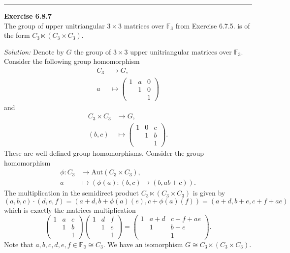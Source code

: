 \documentclass[a4paper, 12pt]{article}
\newenvironment{problem}[2][Exercise]
    { \begin{mdframed}[backgroundcolor=gray!20] \textbf{#1 #2} \\}
    {  \end{mdframed}}
\newenvironment{solution}
    {\textit{Solution:}}
    {}
\begin{document}
\noindent\rule{7in}{2.8pt}
\begin{problem}{6.8.7}
The group of upper unitriangular \(3\times 3\) matrices over \(\mathbb{F}_3\) from Exercise 6.7.5. is of the form \(C_3\ltimes (C_3\times C_3)\).
\end{problem}
\begin{solution}
Denote by \(G\) the group of \(3\times 3\) upper unitriangular matrices over \(\mathbb{F}_3\). Consider the following group homomorphism 
\begin{align*}
    C_3&\rightarrow G,\\ 
    a&\mapsto \begin{pmatrix}
        1&a&0\\ 
        &1&0\\ 
        &&1
    \end{pmatrix} 
\end{align*}
and 
\begin{align*}
    C_3\times C_3&\rightarrow G,\\ 
    (b,c)&\mapsto \begin{pmatrix}
        1&0&c\\ 
        &1&b\\ 
        &&1
    \end{pmatrix}. 
\end{align*}
These are well-defined group homomorphisms. Consider the group homomorphism 
\begin{align*}
    \phi:C_3&\rightarrow \text{Aut}(C_3\times C_3),\\ 
         a&\mapsto (\phi(a):(b,c)\rightarrow (b,ab+c)).
\end{align*}
The multiplication in the semidirect product \(C_3\ltimes (C_3\times C_3)\) is given by 
\[(a,b,c)\cdot (d,e,f)=(a+d,b+\phi(a)(e),c+\phi(a)(f))=(a+d,b+e,c+f+ae)\]
which is exactly the matrices multiplication 
\[\begin{pmatrix}
    1&a&c\\ 
    &1&b\\ 
    &&1
\end{pmatrix}\begin{pmatrix}
    1&d&f\\ 
    &1&e\\ 
    &&1
\end{pmatrix}=\begin{pmatrix}
    1&a+d&c+f+ae\\ 
    &1&b+e\\ 
    &&1
\end{pmatrix}.\]
Note that \(a,b,c,d,e,f\in \mathbb{F_3}\cong C_3\). We have an isomorphism \(G\cong C_3\ltimes (C_3\times C_3)\).
\end{solution}
\end{document}
